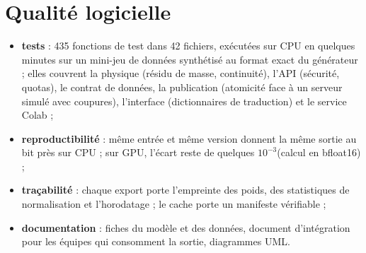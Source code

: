 \section{Qualité logicielle}
\begin{itemize}
  \item \textbf{tests} : 435 fonctions de test dans 42 fichiers, exécutées sur CPU en quelques
        minutes sur un mini-jeu de données synthétisé au format exact du générateur ; elles
        couvrent la physique (résidu de masse, continuité), l'API (sécurité, quotas), le contrat de
        données, la publication (atomicité face à un serveur simulé avec coupures), l'interface
        (dictionnaires de traduction) et le service Colab ;
  \item \textbf{reproductibilité} : même entrée et même version donnent la même sortie au bit près
        sur CPU ; sur GPU, l'écart reste de quelques $10^{-3}$\ms (calcul en bfloat16) ;
  \item \textbf{traçabilité} : chaque export porte l'empreinte des poids, des statistiques de
        normalisation et l'horodatage ; le cache porte un manifeste vérifiable ;
  \item \textbf{documentation} : fiches du modèle et des données, document d'intégration pour les
        équipes qui consomment la sortie, diagrammes UML.
\end{itemize}

